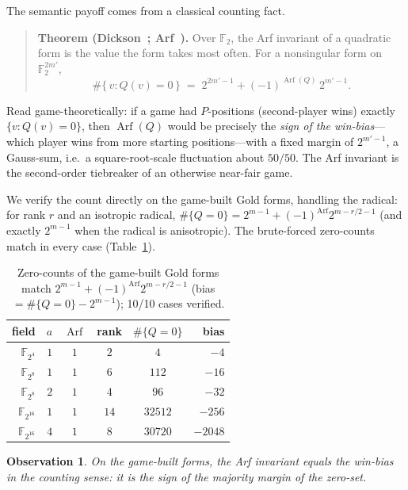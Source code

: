 \documentclass[11pt]{article}
\newtheorem{observation}{Observation}
\theoremstyle{definition}
\newcommand{\F}{\mathbb{F}}
\newcommand{\Arf}{\operatorname{Arf}}
\begin{document}
The semantic payoff comes from a classical counting fact.

\begin{quotation}
\noindent\textbf{Theorem (Dickson~\cite{Dickson01}; Arf~\cite{Arf41}).}
Over $\F_2$, the Arf invariant of a quadratic form is the value the form takes
most often. For a nonsingular form on $\F_2^{2m'}$,
\[
  \#\{\,v : Q(v)=0\,\} \;=\; 2^{2m'-1} + (-1)^{\Arf(Q)}\,2^{m'-1}.
\]
\end{quotation}

\noindent
Read game-theoretically: if a game had $P$-positions (second-player wins)
exactly $\{v:Q(v)=0\}$, then $\Arf(Q)$ would be precisely the \emph{sign of the
win-bias}---which player wins from more starting positions---with a fixed margin
of $2^{m'-1}$, a Gauss-sum, i.e.\ a square-root-scale fluctuation about
$50/50$. The Arf invariant is the second-order tiebreaker of an otherwise
near-fair game.

We verify the count directly on the game-built Gold forms, handling the radical:
for rank $r$ and an isotropic radical, $\#\{Q=0\}=2^{m-1}+(-1)^{\Arf}2^{m-r/2-1}$
(and exactly $2^{m-1}$ when the radical is anisotropic). The brute-forced
zero-counts match in every case (Table~\ref{tab:bias}).

\begin{table}[h]
\centering
\begin{tabular}{rrcccr}
\toprule
field & $a$ & $\Arf$ & rank & $\#\{Q=0\}$ & bias \\
\midrule
$\F_{2^{4}}$  & $1$ & $1$ & $2$  & $4$     & $-4$ \\
$\F_{2^{8}}$  & $1$ & $1$ & $6$  & $112$   & $-16$ \\
$\F_{2^{8}}$  & $2$ & $1$ & $4$  & $96$    & $-32$ \\
$\F_{2^{16}}$ & $1$ & $1$ & $14$ & $32512$ & $-256$ \\
$\F_{2^{16}}$ & $4$ & $1$ & $8$  & $30720$ & $-2048$ \\
\bottomrule
\end{tabular}
\caption{Zero-counts of the game-built Gold forms match
$2^{m-1}+(-1)^{\Arf}2^{m-r/2-1}$ (bias $=\#\{Q=0\}-2^{m-1}$);
10/10 cases verified.}
\label{tab:bias}
\end{table}

\begin{observation}
On the game-built forms, the Arf invariant equals the win-bias in the counting
sense: it is the sign of the majority margin of the zero-set.
\end{observation}
\end{document}
